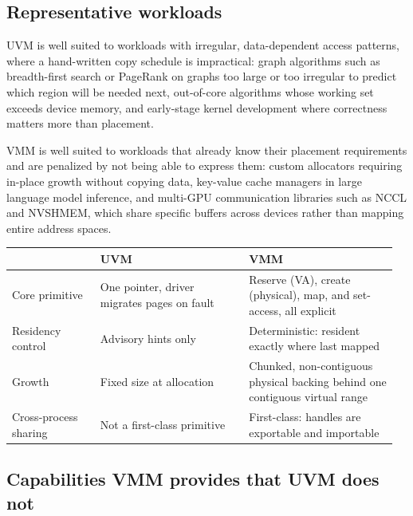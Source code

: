 \subsection{Representative workloads}

UVM is well suited to workloads with irregular, data-dependent access
patterns, where a hand-written copy schedule is impractical: graph
algorithms such as breadth-first search or PageRank on graphs too large or
too irregular to predict which region will be needed next, out-of-core
algorithms whose working set exceeds device memory, and early-stage kernel
development where correctness matters more than placement.

VMM is well suited to workloads that already know their placement
requirements and are penalized by not being able to express them: custom
allocators requiring in-place growth without copying data, key-value cache
managers in large language model inference, and multi-GPU communication
libraries such as NCCL and NVSHMEM, which share specific buffers across
devices rather than mapping entire address spaces.

\begin{center}
\begin{tabular}{@{}p{0.22\linewidth}p{0.37\linewidth}p{0.37\linewidth}@{}}
\toprule
 & \textbf{UVM} & \textbf{VMM} \\
\midrule
Core primitive & One pointer, driver migrates pages on fault & Reserve (VA), create (physical), map, and set-access, all explicit \\
Residency control & Advisory hints only & Deterministic: resident exactly where last mapped \\
Growth & Fixed size at allocation & Chunked, non-contiguous physical backing behind one contiguous virtual range \\
Cross-process sharing & Not a first-class primitive & First-class: handles are exportable and importable \\
\bottomrule
\end{tabular}
\end{center}

\subsection{Capabilities VMM provides that UVM does not}

